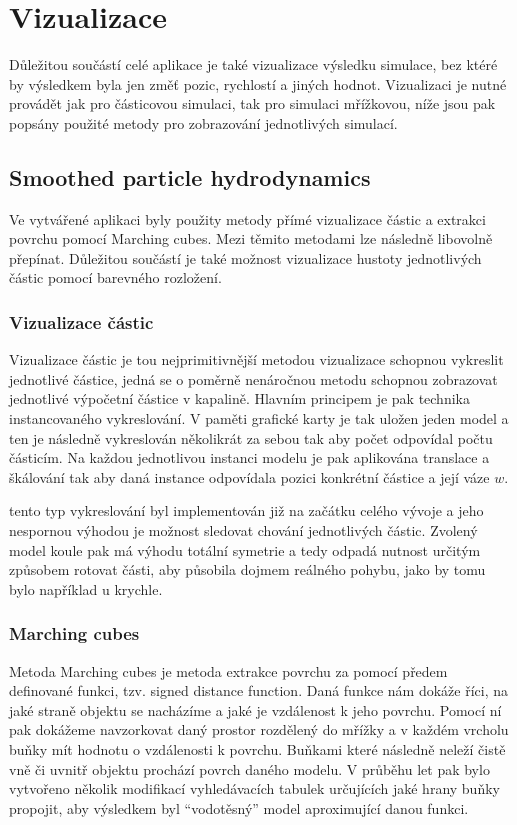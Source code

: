 \section{Vizualizace}
\label{chapter:Vizualizace}
Důležitou součástí celé aplikace je také vizualizace výsledku simulace, bez ktéré by výsledkem byla jen změť pozic, rychlostí a jiných hodnot. Vizualizaci je nutné provádět jak pro částicovou simulaci, tak pro simulaci mřížkovou, níže jsou pak popsány použité metody pro zobrazování jednotlivých simulací.

\subsection{Smoothed particle hydrodynamics}
\label{chapter:vizSPH}
Ve vytvářené aplikaci byly použity metody přímé vizualizace částic a extrakci povrchu pomocí Marching cubes. Mezi těmito metodami lze následně libovolně přepínat. Důležitou součástí je také možnost vizualizace hustoty jednotlivých částic pomocí barevného rozložení.

\subsubsection{Vizualizace částic}
Vizualizace částic je tou nejprimitivnější metodou vizualizace schopnou vykreslit jednotlivé částice, jedná se o poměrně nenáročnou metodu schopnou zobrazovat jednotlivé výpočetní částice v kapalině. Hlavním principem je pak technika instancovaného vykreslování. V paměti grafické karty je tak uložen jeden model a ten je následně vykreslován několikrát za sebou tak aby počet odpovídal počtu částicím. Na každou jednotlivou instanci modelu je pak aplikována translace a škálování tak aby daná instance odpovídala pozici konkrétní částice a její váze $w$.

tento typ vykreslování byl implementován již na začátku celého vývoje a jeho nespornou výhodou je možnost sledovat chování jednotlivých částic. Zvolený model koule pak má výhodu totální symetrie a tedy odpadá nutnost určitým způsobem rotovat části, aby působila dojmem reálného pohybu, jako by tomu bylo například u krychle.

\subsubsection{Marching cubes}
Metoda Marching cubes \cite{marchingCubes} je metoda extrakce povrchu za pomocí předem definované funkci, tzv. signed distance function. Daná funkce nám dokáže říci, na jaké straně objektu se nacházíme a jaké je vzdálenost k jeho povrchu. Pomocí ní pak dokážeme navzorkovat daný prostor rozdělený do mřížky a v každém vrcholu buňky mít hodnotu o vzdálenosti k povrchu. Buňkami které následně neleží čistě vně či uvnitř objektu prochází povrch daného modelu. V průběhu let pak bylo vytvořeno několik modifikací vyhledávacích tabulek určujících jaké hrany buňky propojit, aby výsledkem byl \enquote{vodotěsný} model aproximující danou funkci.

